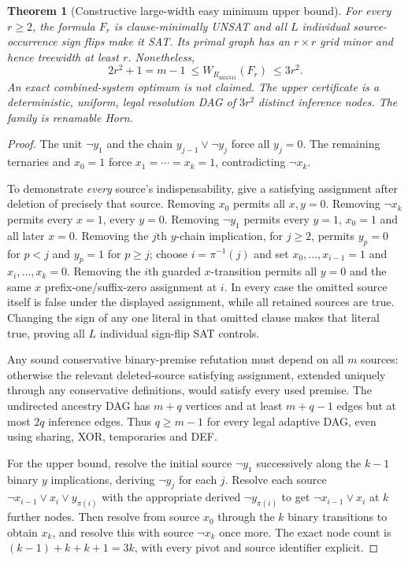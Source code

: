 \documentclass[11pt]{article}
\newtheorem{theorem}{Theorem}
\begin{document}
\begin{theorem}[Constructive large-width easy minimum upper bound]
For every $r\ge2$, the formula $F_r$ is clause-minimally UNSAT and all $L$ individual source-occurrence sign flips make it SAT. Its primal graph has an $r\times r$ grid minor and hence treewidth at least $r$. Nonetheless,
\[
\boxed{2r^2+1=m-1\ \le W_{R_{\mathrm{mix341}}}(F_r)\ \le 3r^2.}
\tag{2}
\]
An exact combined-system optimum is not claimed. The upper certificate is a deterministic, uniform, legal resolution DAG of $3r^2$ distinct inference nodes. The family is renamable Horn.
\end{theorem}
\begin{proof}
The unit $\neg y_1$ and the chain $y_{j-1}\vee\neg y_j$ force all $y_j=0$. The remaining ternaries and $x_0=1$ force $x_1=\cdots=x_k=1$, contradicting $\neg x_k$.

To demonstrate \emph{every} source's indispensability, give a satisfying assignment after deletion of precisely that source. Removing $x_0$ permits all $x,y=0$. Removing $\neg x_k$ permits every $x=1$, every $y=0$. Removing $\neg y_1$ permits every $y=1$, $x_0=1$ and all later $x=0$. Removing the $j$th $y$-chain implication, for $j\ge2$, permits $y_p=0$ for $p<j$ and $y_p=1$ for $p\ge j$; choose $i=\pi^{-1}(j)$ and set $x_0,\dots,x_{i-1}=1$ and $x_i,\dots,x_k=0$. Removing the $i$th guarded $x$-transition permits all $y=0$ and the same $x$ prefix-one/suffix-zero assignment at $i$. In every case the omitted source itself is false under the displayed assignment, while all retained sources are true. Changing the sign of any one literal in that omitted clause makes that literal true, proving all $L$ individual sign-flip SAT controls.

Any sound conservative binary-premise refutation must depend on all $m$ sources: otherwise the relevant deleted-source satisfying assignment, extended uniquely through any conservative definitions, would satisfy every used premise. The undirected ancestry DAG has $m+q$ vertices and at least $m+q-1$ edges but at most $2q$ inference edges. Thus $q\ge m-1$ for every legal adaptive DAG, even using sharing, XOR, temporaries and DEF.

For the upper bound, resolve the initial source $\neg y_1$ successively along the $k-1$ binary $y$ implications, deriving $\neg y_j$ for each $j$. Resolve each source $\neg x_{i-1}\vee x_i\vee y_{\pi(i)}$ with the appropriate derived $\neg y_{\pi(i)}$ to get $\neg x_{i-1}\vee x_i$ at $k$ further nodes. Then resolve from source $x_0$ through the $k$ binary transitions to obtain $x_k$, and resolve this with source $\neg x_k$ once more. The exact node count is $(k-1)+k+k+1=3k$, with every pivot and source identifier explicit.


\end{proof}
\end{document}

